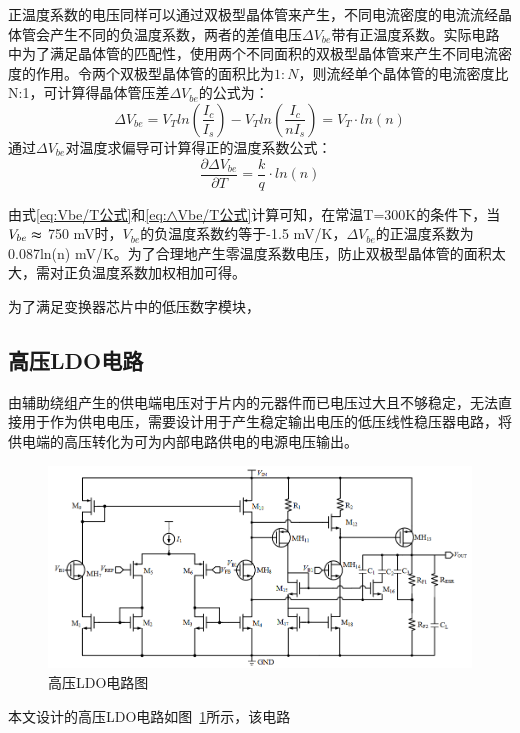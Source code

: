 正温度系数的电压同样可以通过双极型晶体管来产生，不同电流密度的电流流经晶体管会产生不同的负温度系数，两者的差值电压$\varDelta V_{be}$带有正温度系数。实际电路中为了满足晶体管的匹配性，使用两个不同面积的双极型晶体管来产生不同电流密度的作用。令两个双极型晶体管的面积比为$1:N$，则流经单个晶体管的电流密度比N:1，可计算得晶体管压差$\varDelta V_{be}$的公式为：
\begin{equation}
    \label{eq:△Vbe公式}
    \varDelta V_{be} = V_T ln(\frac{I_c}{I_s}) - V_T ln(\frac{I_c}{nI_s}) = V_T \cdot ln(n)
\end{equation}
通过$\varDelta V_{be}$对温度求偏导可计算得正的温度系数公式：
\begin{equation}
    \label{eq:△Vbe/T公式}
    \frac{\partial \varDelta V_{be}}{\partial T} = \frac{k}{q}\cdot ln(n)
\end{equation}


由式\eqref{eq:Vbe/T公式}和\eqref{eq:△Vbe/T公式}计算可知，在常温T=300K的条件下，当$V_{be}\thickapprox $ 750 mV时，$V_{be}$的负温度系数约等于-1.5 mV/K，$\varDelta V_{be}$的正温度系数为0.087ln(n) mV/K。为了合理地产生零温度系数电压，防止双极型晶体管的面积太大，需对正负温度系数加权相加可得。

为了满足变换器芯片中的低压数字模块，



\subsection{高压LDO电路}

由辅助绕组产生的供电端电压对于片内的元器件而已电压过大且不够稳定，无法直接用于作为供电电压，需要设计用于产生稳定输出电压的低压线性稳压器电路，将供电端的高压转化为可为内部电路供电的电源电压输出。
\begin{figure}[htbp] 
    \centering
    \includegraphics[width=0.6\linewidth]{figures/高压LDO.png}
    \caption{高压LDO电路图}
    \label{fig:高压LDO}
\end{figure}

本文设计的高压LDO电路如图~\ref{fig:高压LDO}所示，该电路



